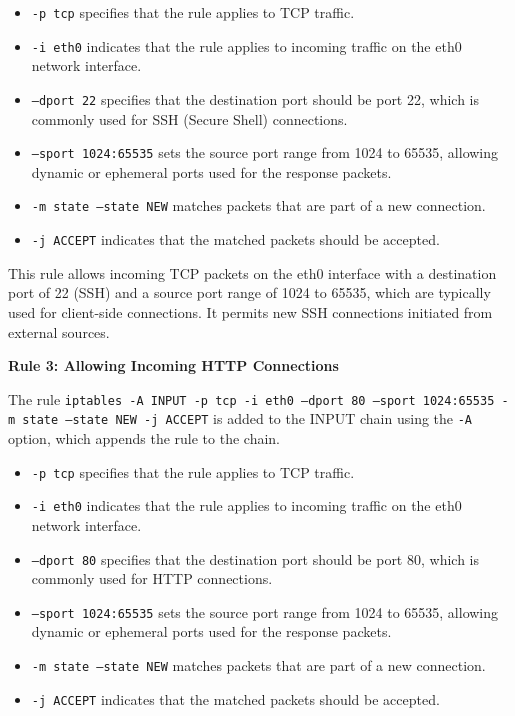 {{		\begin{itemize}
			\item \texttt{-p tcp} specifies that the rule applies to TCP traffic.
			\item \texttt{-i eth0} indicates that the rule applies to incoming traffic on the eth0 network interface.
			\item \texttt{--dport 22} specifies that the destination port should be port 22, which is commonly used for SSH (Secure Shell) connections.
			\item \texttt{--sport 1024:65535} sets the source port range from 1024 to 65535, allowing dynamic or ephemeral ports used for the response packets.
			\item \texttt{-m state --state NEW} matches packets that are part of a new connection.
			\item \texttt{-j ACCEPT} indicates that the matched packets should be accepted.
		\end{itemize}
		
		This rule allows incoming TCP packets on the eth0 interface with a destination port of 22 (SSH) and a source port range of 1024 to 65535, which are typically used for client-side connections. It permits new SSH connections initiated from external sources.
		
		\textbf{Rule 3: Allowing Incoming HTTP Connections}
		
		The rule \texttt{iptables -A INPUT -p tcp -i eth0 --dport 80 --sport 1024:65535 -m state --state NEW -j ACCEPT} is added to the INPUT chain using the \texttt{-A} option, which appends the rule to the chain.
		
		\begin{itemize}
			\item \texttt{-p tcp} specifies that the rule applies to TCP traffic.
			\item \texttt{-i eth0} indicates that the rule applies to incoming traffic on the eth0 network interface.
			\item \texttt{--dport 80} specifies that the destination port should be port 80, which is commonly used for HTTP connections.
			\item \texttt{--sport 1024:65535} sets the source port range from 1024 to 65535, allowing dynamic or ephemeral ports used for the response packets.
			\item \texttt{-m state --state NEW} matches packets that are part of a new connection.
			\item \texttt{-j ACCEPT} indicates that the matched packets should be accepted.
		\end{itemize}
		
}}
